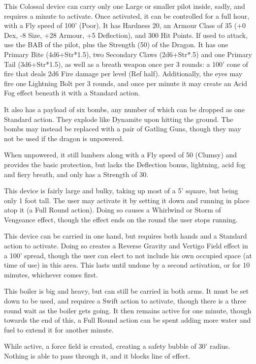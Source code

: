 {This Colossal device can carry only one Large or smaller pilot inside, sadly, and requires a minute to activate. Once activated, it can be controlled for a full hour, with a Fly speed of 100' (Poor). It has Hardness 20, an Armour Class of 35 (+0 Dex, -8 Size, +28 Armour, +5 Deflection), and 300 Hit Points. If used to attack, use the BAB of the pilot, plus the Strength (50) of the Dragon. It has one Primary Bite (4d6+Str*1.5), two Secondary Claws (2d6+Str*.5) and one Primary Tail (3d6+Str*1.5), as well as a breath weapon once per 3 rounds: a 100' cone of fire that deals 2d6 Fire damage per level (Ref half). Additionally, the eyes may fire one Lightning Bolt per 3 rounds, and once per minute it may create an Acid Fog effect beneath it with a Standard action.\medskip

\noindent It also has a payload of six bombs, any number of which can be dropped as one Standard action. They explode like Dynamite upon hitting the ground. The bombs may instead be replaced with a pair of Gatling Guns, though they may not be used if the dragon is unpowered.\medskip

\noindent When unpowered, it still lumbers along with a Fly speed of 50 (Clumsy) and provides the basic protection, but lacks the Deflection bonus, lightning, acid fog and fiery breath, and only has a Strength of 30.}

{This device is fairly large and bulky, taking up most of a 5' square, but being only 1 foot tall. The user may activate it by setting it down and running in place atop it (a Full Round action). Doing so causes a Whirlwind or Storm of Vengeance effect, though the effect ends on the round the user stops running.}

{This device can be carried in one hand, but requires both hands and a Standard action to activate. Doing so creates a Reverse Gravity and Vertigo Field effect in a 100' spread, though the user can elect to not include his own occupied space (at time of use) in this area. This lasts until undone by a second activation, or for 10 minutes, whichever comes first.}

{This boiler is big and heavy, but can still be carried in both arms. It must be set down to be used, and requires a Swift action to activate, though there is a three round wait as the boiler gets going. It then remains active for one minute, though towards the end of this, a Full Round action can be spent adding more water and fuel to extend it for another minute.\medskip

\noindent While active, a force field is created, creating a safety bubble of 30' radius. Nothing is able to pass through it, and it blocks line of effect.}

